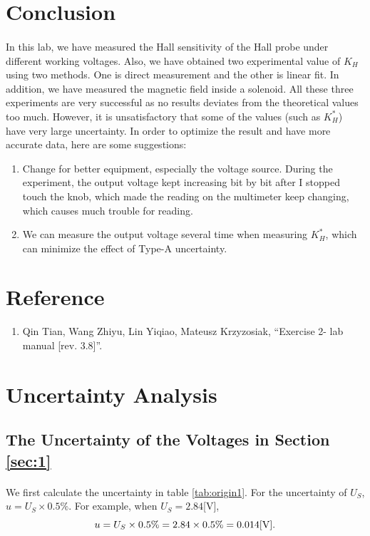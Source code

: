\documentclass[a4paper]{article}
\begin{document}
    \section{Conclusion}
    \paragraph{} In this lab, we have measured the Hall sensitivity of the Hall probe under different working voltages. Also, we have obtained two experimental value of $K_H$ using two methods. One is direct measurement and the other is linear fit. In addition, we have measured the magnetic field inside a solenoid. All these three experiments are very successful as no results deviates from the theoretical values too much. However, it is unsatisfactory that some of the values (such as $K_H^*$) have very large uncertainty. In order to optimize the result and have more accurate data, here are some suggestions: 
    \begin{enumerate}
        \item Change for better equipment, especially the voltage source. During the experiment, the output voltage kept increasing bit by bit after I stopped touch the knob, which made the reading on the multimeter keep changing, which causes much trouble for reading.
        \item We can measure the output voltage several time when measuring $K_H^*$, which can minimize the effect of Type-A uncertainty.
    \end{enumerate}
    \section{Reference}
    \begin{enumerate}
        \item Qin Tian, Wang Zhiyu, Lin Yiqiao, Mateusz Krzyzosiak, ``Exercise 2- lab manual [rev. 3.8]''.
    \end{enumerate}
    \renewcommand\thesection{\Alph{section}} 
    \setcounter{section}{0}
    \newpage
    \section{Uncertainty Analysis}
    \subsection{The Uncertainty of the Voltages in Section \ref{sec:1}}
    \paragraph{} We first calculate the uncertainty in table \ref{tab:origin1}. For the uncertainty of $U_S$, $u=U_S\times 0.5\%$. For example, when $U_S=2.84$[V], $$u=U_S\times 0.5\%=2.84 \times 0.5\%=0.014[\rm V].$$
\end{document}
